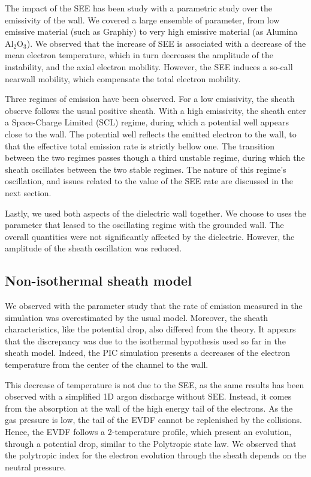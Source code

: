 The impact of the SEE has been study with a parametric study over the emissivity of the wall.
We covered a large ensemble of parameter, from low emissive material (such as Graphiy) to very high emissive material (as Alumina Al$_2$O$_3$).
We observed that the increase of SEE is associated with a decrease of the mean electron temperature, which in turn decreases the amplitude of the instability, and the axial electron mobility.
However, the SEE induces a so-call nearwall mobility, which compensate the total electron  mobility.

Three regimes of emission have been observed.
For a low emissivity, the sheath observe follows the usual positive sheath.
With a high emissivity, the sheath enter a Space-Charge Limited (SCL) regime, during which a potential well appears close to the wall.
The potential well reflects the emitted electron to the wall, to that the effective total emission rate is strictly bellow one.
The transition between the two regimes passes though a third unstable regime, during which the sheath oscillates between the two stable regimes.
The nature of this regime's oscillation, and issues related to the value of the SEE rate are discussed in the next section.

Lastly, we used both aspects of the dielectric wall together.
We choose to uses the parameter that leased to the oscillating regime with the grounded wall.
The overall quantities were not significantly affected by the dielectric.
However, the amplitude of the sheath oscillation was reduced.

\subsection{Non-isothermal sheath model}

We observed with the parameter study that the rate of emission measured in the simulation was overestimated by the usual model.
Moreover, the sheath characteristics, like the potential drop, also differed from the theory.
It appears that the discrepancy was due to the isothermal hypothesis used so far in the sheath model.
Indeed, the PIC simulation presents a decreases of the electron temperature from the center of the channel to the wall.

This decrease of temperature is not due to the SEE, as the same results has been observed with a simplified 1D argon discharge without SEE.
Instead, it comes from the absorption at the wall of the high energy tail of the electrons.
As the gas pressure is low, the tail of the EVDF cannot be replenished by the collisions.
Hence, the EVDF follows a 2-temperature profile, which present an evolution, through a potential drop, similar to the Polytropic state law. 
We observed that the polytropic index for the electron evolution through the sheath depends on the neutral pressure.

